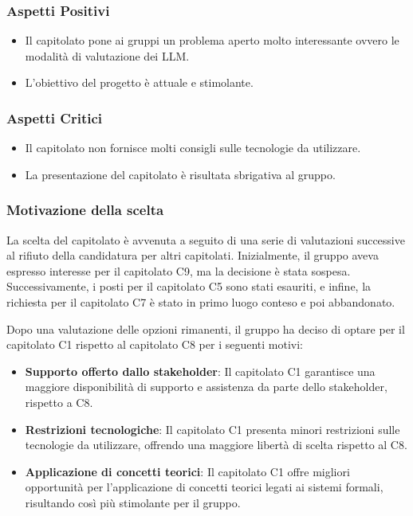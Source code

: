\documentclass[a4paper, 12pt]{article}
\begin{document}
\subsubsection{Aspetti Positivi}
\begin{itemize}
    \item Il capitolato pone ai gruppi un problema aperto molto interessante ovvero le modalità di valutazione dei LLM.
    \item L'obiettivo del progetto è attuale e stimolante.
\end{itemize}

\subsubsection{Aspetti Critici}
\begin{itemize}
    \item Il capitolato non fornisce molti consigli sulle tecnologie da utilizzare.
    \item La presentazione del capitolato è risultata sbrigativa al gruppo.
\end{itemize}

\subsubsection{Motivazione della scelta}
La scelta del capitolato è avvenuta a seguito di una serie di valutazioni successive al rifiuto della candidatura per altri capitolati. Inizialmente, il gruppo aveva espresso interesse per il capitolato C9, ma la decisione è stata sospesa. Successivamente, i posti per il capitolato C5 sono stati esauriti, e infine, la richiesta per il capitolato C7 è stato in primo luogo conteso e poi abbandonato. 

Dopo una valutazione delle opzioni rimanenti, il gruppo ha deciso di optare per il capitolato C1 rispetto al capitolato C8 per i seguenti motivi:
\begin{itemize}
    \item \textbf{Supporto offerto dallo stakeholder}: Il capitolato C1 garantisce una maggiore disponibilità di supporto e assistenza da parte dello stakeholder, rispetto a C8.
    \item \textbf{Restrizioni tecnologiche}: Il capitolato C1 presenta minori restrizioni sulle tecnologie da utilizzare, offrendo una maggiore libertà di scelta rispetto al C8.
    \item \textbf{Applicazione di concetti teorici}: Il capitolato C1 offre migliori opportunità per l'applicazione di concetti teorici legati ai sistemi formali, risultando così più stimolante per il gruppo.
\end{itemize}
\end{document}
